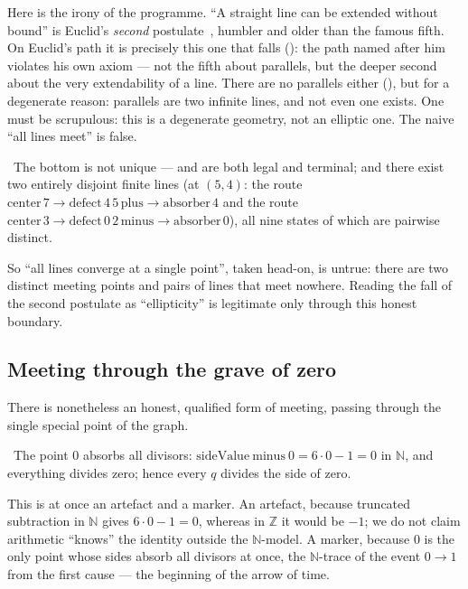 Here is the irony of the programme. ``A straight line can be extended without bound'' is Euclid's
\emph{second} postulate~\cite{euclid-elements}, humbler and older than the famous fifth. On Euclid's
path it is precisely this one that falls (): the path named after
him violates his own axiom --- not the fifth about parallels, but the deeper second about the very
extendability of a line. There are no parallels either (), but for a
degenerate reason: parallels are two infinite lines, and not even one exists. One must be scrupulous:
this is a degenerate geometry, not an elliptic one. The naive ``all lines meet'' is false.

\begin{theorem}\label{thm:two_disjoint_lines}
\green{}\ The bottom is not unique ---  and  are both legal and
terminal; and there exist two entirely disjoint finite lines (at $(5,4)$: the route
$\mathrm{center}\,7 \to \mathrm{defect}\,4\,5\,\mathrm{plus} \to \mathrm{absorber}\,4$ and the route
$\mathrm{center}\,3 \to \mathrm{defect}\,0\,2\,\mathrm{minus} \to \mathrm{absorber}\,0$), all nine
states of which are pairwise distinct. 
\end{theorem}

So ``all lines converge at a single point'', taken head-on, is untrue: there are two distinct meeting
points and pairs of lines that meet nowhere. Reading the fall of the second postulate as
``ellipticity'' is legitimate only through this honest boundary.

\subsection{Meeting through the grave of zero}

There is nonetheless an honest, qualified form of meeting, passing through the single special point of
the graph.

\begin{theorem}\label{thm:zeroPoint_absorbs_all_divisors}
\green{}\ The point $0$ absorbs all divisors: $\mathrm{sideValue}\ \mathrm{minus}\ 0 = 6\cdot 0 - 1 = 0$
in $\mathbb{N}$, and everything divides zero; hence every $q$ divides the side of zero.
\end{theorem}

This is at once an artefact and a marker. An artefact, because truncated subtraction in $\mathbb{N}$
gives $6\cdot 0 - 1 = 0$, whereas in $\mathbb{Z}$ it would be $-1$; we do not claim arithmetic
``knows'' the identity outside the $\mathbb{N}$-model. A marker, because $0$ is the only point whose
sides absorb all divisors at once, the $\mathbb{N}$-trace of the event $0 \to 1$ from the first
cause --- the beginning of the arrow of time.

